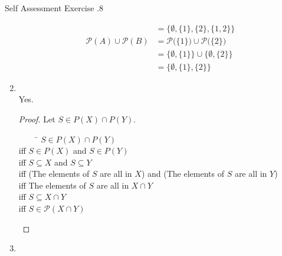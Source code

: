 \documentclass[../notes.tex]{subfiles}
\begin{document}
\begin{exercise}{Self Assessment Exercise \thechapter.8}
\begin{enumerate}
\begin{align*}
						&= \bigl\{\emptyset, \{1\}, \{2\}, \{1, 2\}\bigr\}\\
						\mathcal{P}(A) \cup \mathcal{P}(B) &= \mathcal{P}\bigl(\{1\}\bigr) \cup \mathcal{P}\bigl(\{2\}\bigr)\\
						&= \bigl\{\emptyset, \{1\}\bigr\} \cup \bigl\{\emptyset, \{2\}\bigr\}\\
						&= \bigl\{\emptyset, \{1\}, \{2\}\bigr\}
					\end{align*}
				\pagebreak
				\item {}\\
					Yes.
					\begin{proof}
						Let $S \in P(X) \cap P(Y)$.
						\begin{tabbing}
							$\qquad$ \= $S \in P(X) \cap P(Y)$\\
							iff \> $S \in P(X)$ and $S \in P(Y)$\\
							iff \> $S \subseteq X$ and $S \subseteq Y$\\
							iff \> (The elements of $S$ are all in $X$) and (The elements of $S$ are all in $Y$)\\
							iff \> The elements of $S$ are all in $X \cap Y$\\
							iff \> $S \subseteq X \cap Y$\\
							iff \> $S \in \mathcal{P}(X \cap Y)$
						\end{tabbing}
					\end{proof}
				\item {}
					\begin{center}
						\begin{vennthree}[labelA=$X$, labelB=$Y$, labelC=$Z$, tikzoptions={scale=0.8}][$X$]
							\fillA
						\end{vennthree}
						\begin{vennthree}[labelA=$X$, labelB=$Y$, labelC=$Z$, tikzoptions={scale=0.8}][$Y - Z$]
							\fillBNotC
						\end{vennthree}
						\begin{vennthree}[labelA=$X$, labelB=$Y$, labelC=$Z$, tikzoptions={scale=0.8}][$X - (Y - Z)$]
							\fillOnlyA
							\fillACapC
						\end{vennthree}
						\begin{vennthree}[labelA=$X$, labelB=$Y$, labelC=$Z$, tikzoptions={scale=0.8}][$X - Y$]

\end{vennthree}
\end{center}
\end{enumerate}
\end{exercise}
\end{document}
